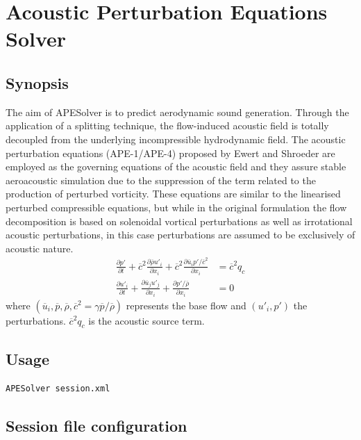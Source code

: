 \chapter{Acoustic Perturbation Equations Solver}

\section{Synopsis}
The aim of APESolver is to predict aerodynamic sound generation. Through
the application of a splitting technique, the flow-induced acoustic field is
totally decoupled from the underlying incompressible hydrodynamic field. The
acoustic perturbation equations (APE-1/APE-4) proposed by Ewert and Shroeder are employed as
the governing equations of the acoustic field and they assure stable
aeroacoustic simulation due to the suppression of the term related to the
production of perturbed vorticity. These equations are similar to the linearised
perturbed compressible equations, but while in the original formulation the flow
decomposition is based on solenoidal vortical perturbations as well as
irrotational acoustic perturbations, in this case perturbations are assumed to
be exclusively of acoustic nature.
\begin{subequations}
    \begin{align*}
	\frac{\partial p'}{\partial t}
	+ \overline{c}^2 \frac{\partial \overline{\rho} u'_i}{\partial x_i}
	+ \overline{c}^2 \frac{\partial \overline{u}_i p' / \overline{c}^2}{\partial x_i}
	&= \overline{c}^2 q_c
	\\
	\frac{\partial u'_i}{\partial t}
	+ \frac{\partial \overline{u}_j u'_j}{\partial x_i}
	+ \frac{\partial p' / \overline{\rho}}{\partial x_i}
	&= 0
	\end{align*}
\end{subequations}
where $(\overline{u}_i,\overline{p}, \overline{\rho}, \overline{c}^2 = \gamma \overline{p} / \overline{\rho} )$ represents the base flow and $(u'_i,p')$ the perturbations.
$\overline{c}^2 q_c$ is the acoustic source term.

\section{Usage}
\begin{lstlisting}[style=BashInputStyle]
APESolver session.xml
\end{lstlisting}

\section{Session file configuration}

